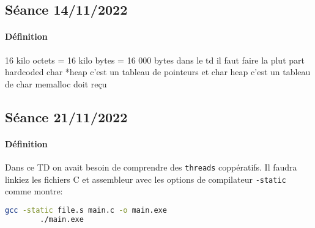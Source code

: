 \documentclass{article}
\begin{document}
\newpage\subsection{Séance 14/11/2022}
\paragraph{Définition}16 kilo octets = 16 kilo bytes = 16 000 bytes
dans le td il faut faire la plut part hardcoded
char *heap c'est un tableau de pointeurs et char heap c'est un tableau de char
memalloc doit reçu

\newpage\subsection{Séance 21/11/2022}
\paragraph{Définition}Dans ce TD on avait besoin de comprendre des \texttt{threads} coppératifs. Il faudra linkiez les fichiers C et assembleur avec les options de compilateur \texttt{-static} comme montre:
\begin{scriptsize}\mycode
    \begin{lstlisting}[language=Bash]
        gcc -static file.s main.c -o main.exe
        ./main.exe
    \end{lstlisting}
\end{scriptsize}
\end{document}
